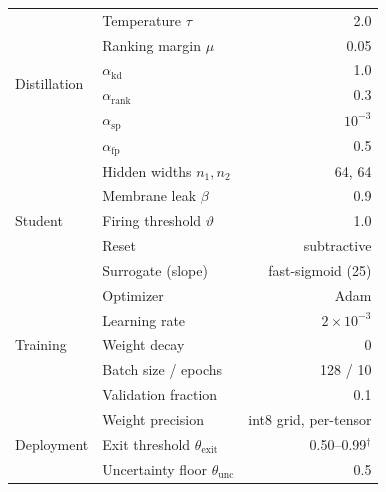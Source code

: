 \begin{table}[!t]
\begin{tabular}{llr}
\multirow{6}{*}{Distillation}
 & Temperature $\tau$              & 2.0 \\
 & Ranking margin $\mu$            & 0.05 \\
 & $\alpha_{\mathrm{kd}}$          & 1.0 \\
 & $\alpha_{\mathrm{rank}}$        & 0.3 \\
 & $\alpha_{\mathrm{sp}}$          & $10^{-3}$ \\
 & $\alpha_{\mathrm{fp}}$          & 0.5 \\
\midrule
\multirow{5}{*}{Student}
 & Hidden widths $n_1, n_2$    & 64, 64 \\
 & Membrane leak $\beta$       & 0.9 \\
 & Firing threshold $\vartheta$& 1.0 \\
 & Reset                       & subtractive \\
 & Surrogate (slope)           & fast-sigmoid (25) \\
\midrule
\multirow{5}{*}{Training}
 & Optimizer                   & Adam \\
 & Learning rate               & $2\times10^{-3}$ \\
 & Weight decay                & 0 \\
 & Batch size / epochs         & 128 / 10 \\
 & Validation fraction         & 0.1 \\
\midrule
\multirow{3}{*}{Deployment}
 & Weight precision            & int8 grid, per-tensor \\
 & Exit threshold $\theta_{\mathrm{exit}}$ & 0.50--0.99$^\dagger$ \\
 & Uncertainty floor $\theta_{\mathrm{unc}}$ & 0.5 \\
\bottomrule
\end{tabular}
\end{table}
